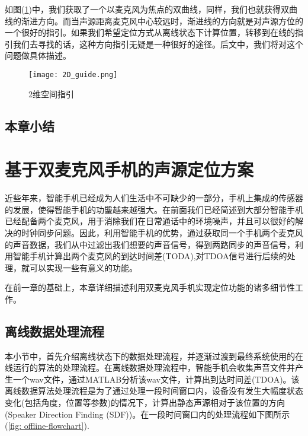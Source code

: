 \documentclass[winfonts]{njuthesis}
\begin{document}
		如图(\ref{fig: 2D_guide})中，我们获取了一个以麦克风为焦点的双曲线，同样，我们也就获得双曲线的渐进方向。而当声源距离麦克风中心较远时，渐进线的方向就是对声源方位的一个很好的指引。如果我们希望定位方式从离线状态下计算位置，转移到在线的指引我们去寻找的话，这种方向指引无疑是一种很好的途径。后文中，我们将对这个问题做具体描述。
		
		\begin{figure}[H]
			\centering
			\texttt{[image: 2D\_guide.png]} 
			\caption{2维空间指引}
			\label{fig: 2D_guide}
		\end{figure}
		
	\section{本章小结}
	
\chapter{基于双麦克风手机的声源定位方案}\label{chapter_work}
	
	近些年来，智能手机已经成为人们生活中不可缺少的一部分，手机上集成的传感器的发展，使得智能手机的功螚越来越强大。在前面我们已经简述到大部分智能手机已经配备两个麦克风，用于消除我们在日常通话中的环境噪声，并且可以很好的解决的时钟同步问题。因此，利用智能手机的优势，通过获取同一个手机两个麦克风的声音数据，我们从中过滤出我们想要的声音信号，得到两路同步的声音信号，利用智能手机计算出两个麦克风的到达时间差(TODA),对TDOA信号进行后续的处理，就可以实现一些有意义的功能。
	
	在前一章的基础上，本章详细描述利用双麦克风手机实现定位功能的诸多细节性工作。
	
	\section{离线数据处理流程}
	
		本小节中，首先介绍离线状态下的数据处理流程，并逐渐过渡到最终系统使用的在线运行的算法的处理流程。在离线数据处理流程中，智能手机会收集声音文件并产生一个wav文件，通过MATLAB分析该wav文件，计算出到达时间差(TDOA)。该离线数据算法处理流程是为了通过处理一段时间窗口内，设备没有发生大幅度状态变化(包括角度，位置等参数)的情况下，计算出静态声源相对于该位置的方向(Speaker Direction Finding (SDF))。在一段时间窗口内的处理流程如下图所示(\ref{fig: offline-flowchart}).
		
\end{document}
